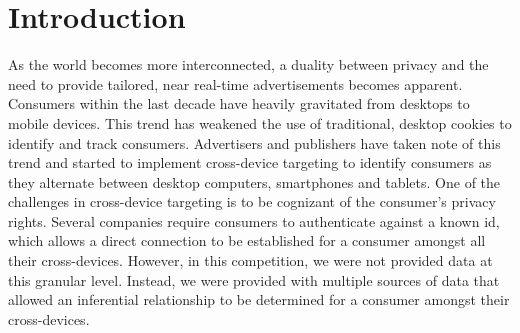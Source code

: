 \documentclass[9pt, journal]{IEEEtran}
\begin{document}
\maketitle


\IEEEdisplaynontitleabstractindextext







%



\section{Introduction}
As the world becomes more interconnected, a duality between privacy and the need to provide tailored, near real-time advertisements becomes apparent. 
Consumers within the last decade have heavily gravitated from desktops to mobile devices. 
This trend has weakened the use of traditional, desktop cookies to identify and track consumers. 
Advertisers and publishers have taken note of this trend and started to implement cross-device targeting to identify consumers as they alternate between desktop computers, smartphones and tablets. 
One of the challenges in cross-device targeting is to be cognizant of the consumer’s privacy rights. 
Several companies require consumers to authenticate against a known id, which allows a direct connection to be established for a consumer amongst all their cross-devices. 
However, in this competition, we were not provided data at this granular level. 
Instead, we were provided with multiple sources of data that allowed an inferential relationship to be determined for a consumer amongst their cross-devices. 
\end{document}
